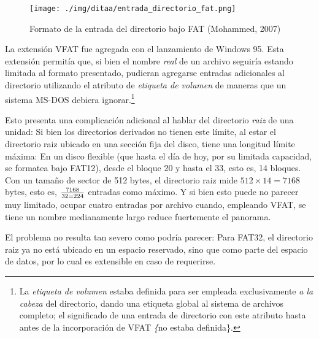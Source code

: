 \documentclass[11pt,fleqn]{book} %
\begin{document}
\begin{figure}[htb]
\centering
\texttt{[image: ./img/ditaa/entrada\_directorio\_fat.png]}
\caption{\label{FS_entrada_directorio_fat}Formato de la entrada del directorio bajo FAT (Mohammed, 2007)}
\end{figure}

La extensión VFAT fue agregada con el lanzamiento de Windows 95. Esta
extensión permitía que, si bien el nombre \emph{real} de un archivo
seguiría estando limitada al formato presentado, pudieran agregarse
entradas adicionales al directorio utilizando el atributo de \emph{etiqueta de volumen} de maneras que un sistema MS-DOS debiera ignorar.\footnote{La
\emph{etiqueta de volumen} estaba definida para ser empleada exclusivamente
\emph{a la cabeza} del directorio, dando una etiqueta global al sistema de
archivos completo; el significado de una entrada de directorio con
este atributo hasta antes de la incorporación de VFAT \emph\{no estaba
definida\}. }

Esto presenta una complicación adicional al hablar del directorio
\emph{raiz} de una unidad: Si bien los directorios derivados no tienen este
límite, al estar el directorio raiz ubicado en una sección fija del
disco, tiene una longitud límite máxima: En un disco flexible (que
hasta el día de hoy, por su limitada capacidad, se formatea bajo
FAT12), desde el bloque 20 y hasta el 33, esto es, 14 bloques. Con un
tamaño de sector de 512 bytes, el directorio raiz mide $512 \times 14
= 7168$ bytes, esto es, $7168 \over 32 = 224$ entradas como máximo. Y
si bien esto puede no parecer muy limitado, ocupar cuatro entradas por
archivo cuando, empleando VFAT, se tiene un nombre medianamente largo
reduce fuertemente el panorama.

El problema no resulta tan severo como podría parecer: Para FAT32, el
directorio raiz ya no está ubicado en un espacio reservado, sino que
como parte del espacio de datos, por lo cual es extensible en caso de
requerirse.
\end{document}
